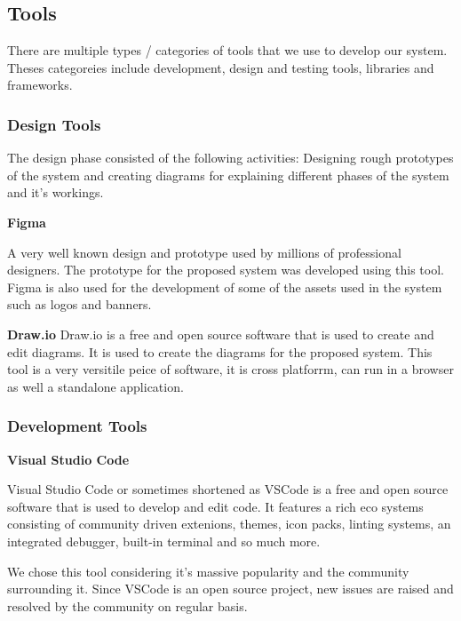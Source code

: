 
\subsection{Tools}

There are multiple types / categories of tools that we use to develop our system. Theses categoreies include development, design and testing tools, libraries and frameworks.

\subsubsection{Design Tools}
The design phase consisted of the following activities: Designing rough prototypes of the system and creating diagrams for explaining different phases of the system and it's workings.

\hspace{5mm}

\textbf{Figma}

A very well known design and prototype used by millions of professional designers. The prototype for the proposed system was developed using this tool. Figma is also used for the development of some of the assets used in the system such as logos and banners.

\hspace{5mm}

\textbf{Draw.io}
Draw.io is a free and open source software that is used to create and edit diagrams. It is used to create the diagrams for the proposed system. This tool is a very versitile peice of software, it is cross platforrm, can run in a browser as well a standalone application.


\subsubsection{Development Tools}

\hspace{5mm}


\textbf{Visual Studio Code}


Visual Studio Code or sometimes shortened as VSCode is a free and open source software that is used to develop and edit code. It features a rich eco systems consisting of community driven extenions, themes, icon packs, linting systems, an integrated debugger, built-in terminal and so much more.



We chose this tool considering it's massive popularity and the community surrounding it. Since VSCode is an open source project, new issues are raised and resolved by the community on regular basis.


